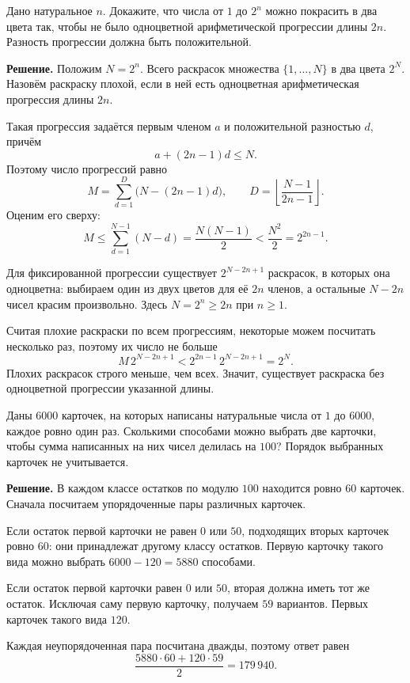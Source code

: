 \begin{problems}
\item Дано натуральное $n$. Докажите, что числа от $1$ до $2^n$ можно покрасить в два цвета так, чтобы не было одноцветной арифметической прогрессии длины $2n$. Разность прогрессии должна быть положительной.
\par\smallskip\noindent\textbf{Решение.} Положим $N=2^n$. Всего раскрасок множества $\{1,\ldots,N\}$ в два цвета $2^N$. Назовём раскраску плохой, если в ней есть одноцветная арифметическая прогрессия длины $2n$.
\par Такая прогрессия задаётся первым членом $a$ и положительной разностью $d$, причём
\[
a+(2n-1)d\le N.
\]
Поэтому число прогрессий равно
\[
M=\sum_{d=1}^{D}\bigl(N-(2n-1)d\bigr),
\qquad D=\left\lfloor\frac{N-1}{2n-1}\right\rfloor.
\]
Оценим его сверху:
\[
M\le\sum_{d=1}^{N-1}(N-d)
=\frac{N(N-1)}2
<\frac{N^2}{2}=2^{2n-1}.
\]
\par Для фиксированной прогрессии существует $2^{N-2n+1}$ раскрасок, в которых она одноцветна: выбираем один из двух цветов для её $2n$ членов, а остальные $N-2n$ чисел красим произвольно. Здесь $N=2^n\ge2n$ при $n\ge1$.
\par Считая плохие раскраски по всем прогрессиям, некоторые можем посчитать несколько раз, поэтому их число не больше
\[
M\,2^{N-2n+1}<2^{2n-1}\,2^{N-2n+1}=2^N.
\]
Плохих раскрасок строго меньше, чем всех. Значит, существует раскраска без одноцветной прогрессии указанной длины.\par

\item Даны $6000$ карточек, на которых написаны натуральные числа от $1$ до $6000$, каждое ровно один раз. Сколькими способами можно выбрать две карточки, чтобы сумма написанных на них чисел делилась на $100$? Порядок выбранных карточек не учитывается.
\par\smallskip\noindent\textbf{Решение.} В каждом классе остатков по модулю $100$ находится ровно $60$ карточек. Сначала посчитаем упорядоченные пары различных карточек.
\par Если остаток первой карточки не равен $0$ или $50$, подходящих вторых карточек ровно $60$: они принадлежат другому классу остатков. Первую карточку такого вида можно выбрать $6000-120=5880$ способами.
\par Если остаток первой карточки равен $0$ или $50$, вторая должна иметь тот же остаток. Исключая саму первую карточку, получаем $59$ вариантов. Первых карточек такого вида $120$.
\par Каждая неупорядоченная пара посчитана дважды, поэтому ответ равен
\[
\frac{5880\cdot60+120\cdot59}{2}=179\,940.
\]\par


\end{problems}
